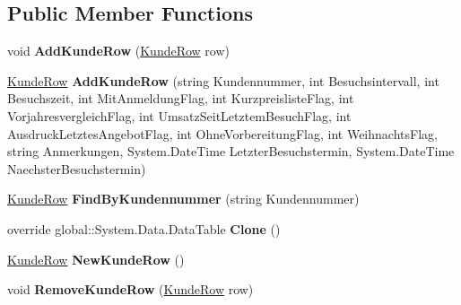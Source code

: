 \subsection*{Public Member Functions}
\begin{DoxyCompactItemize}
\item 
void {\bfseries Add\+Kunde\+Row} (\hyperlink{class_products_1_1_data_1_1ds_sage_1_1_kunde_row}{Kunde\+Row} row)\hypertarget{class_products_1_1_data_1_1ds_sage_1_1_kunde_data_table_ada90d4d2347eb823f68e724132339ed7}{}\label{class_products_1_1_data_1_1ds_sage_1_1_kunde_data_table_ada90d4d2347eb823f68e724132339ed7}

\item 
\hyperlink{class_products_1_1_data_1_1ds_sage_1_1_kunde_row}{Kunde\+Row} {\bfseries Add\+Kunde\+Row} (string Kundennummer, int Besuchsintervall, int Besuchszeit, int Mit\+Anmeldung\+Flag, int Kurzpreisliste\+Flag, int Vorjahresvergleich\+Flag, int Umsatz\+Seit\+Letztem\+Besuch\+Flag, int Ausdruck\+Letztes\+Angebot\+Flag, int Ohne\+Vorbereitung\+Flag, int Weihnachts\+Flag, string Anmerkungen, System.\+Date\+Time Letzter\+Besuchstermin, System.\+Date\+Time Naechster\+Besuchstermin)\hypertarget{class_products_1_1_data_1_1ds_sage_1_1_kunde_data_table_a4c3874cafac016b419c298fc01398b7c}{}\label{class_products_1_1_data_1_1ds_sage_1_1_kunde_data_table_a4c3874cafac016b419c298fc01398b7c}

\item 
\hyperlink{class_products_1_1_data_1_1ds_sage_1_1_kunde_row}{Kunde\+Row} {\bfseries Find\+By\+Kundennummer} (string Kundennummer)\hypertarget{class_products_1_1_data_1_1ds_sage_1_1_kunde_data_table_a57243ed4a1742c55e3e24bd3121ce41c}{}\label{class_products_1_1_data_1_1ds_sage_1_1_kunde_data_table_a57243ed4a1742c55e3e24bd3121ce41c}

\item 
override global\+::\+System.\+Data.\+Data\+Table {\bfseries Clone} ()\hypertarget{class_products_1_1_data_1_1ds_sage_1_1_kunde_data_table_ad611312b88150af2870922f7befff72c}{}\label{class_products_1_1_data_1_1ds_sage_1_1_kunde_data_table_ad611312b88150af2870922f7befff72c}

\item 
\hyperlink{class_products_1_1_data_1_1ds_sage_1_1_kunde_row}{Kunde\+Row} {\bfseries New\+Kunde\+Row} ()\hypertarget{class_products_1_1_data_1_1ds_sage_1_1_kunde_data_table_a656bb2c3ef3095118b996e21229e6cc8}{}\label{class_products_1_1_data_1_1ds_sage_1_1_kunde_data_table_a656bb2c3ef3095118b996e21229e6cc8}

\item 
void {\bfseries Remove\+Kunde\+Row} (\hyperlink{class_products_1_1_data_1_1ds_sage_1_1_kunde_row}{Kunde\+Row} row)\hypertarget{class_products_1_1_data_1_1ds_sage_1_1_kunde_data_table_ad39bec76a7f7037f76fe9a61574e475d}{}\label{class_products_1_1_data_1_1ds_sage_1_1_kunde_data_table_ad39bec76a7f7037f76fe9a61574e475d}

\end{DoxyCompactItemize}
